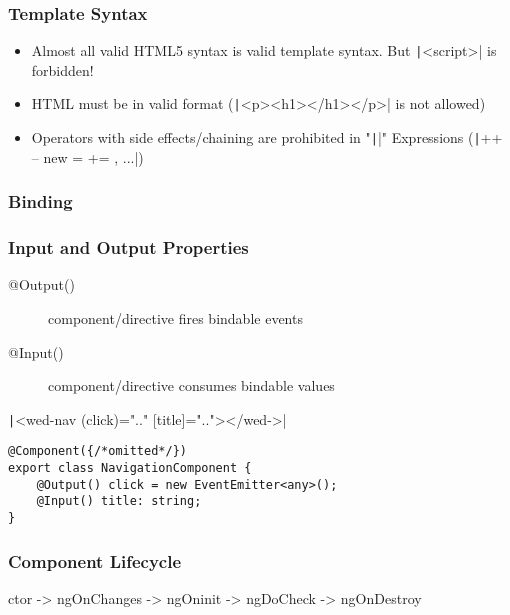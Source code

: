 \begin{multicols*}{2}
\subsubsection{Template Syntax}
\begin{itemize}
    \item Almost all valid HTML5 syntax is valid template syntax. But \texttt|<script>| is forbidden!
    \item HTML must be in valid format (\texttt|<p><h1></h1></p>| is not allowed)
    \item Operators with side effects/chaining are prohibited in "\texttt|{{}}|" Expressions (\texttt|++ -- new = += , ...|)
\end{itemize}

\subsubsection{Binding}

\subsubsection{Input and Output Properties}
\begin{description}
    \item[@Output()] component/directive fires bindable events
    \item[@Input()] component/directive consumes bindable values
\end{description}
\texttt|<wed-nav (click)=".." [title]=".."></wed->|
\begin{verbatim}
@Component({/*omitted*/})
export class NavigationComponent {
    @Output() click = new EventEmitter<any>();
    @Input() title: string;
}
\end{verbatim}

\subsubsection{Component Lifecycle}
ctor -> ngOnChanges -> ngOninit -> ngDoCheck -> ngOnDestroy


\end{multicols*}
